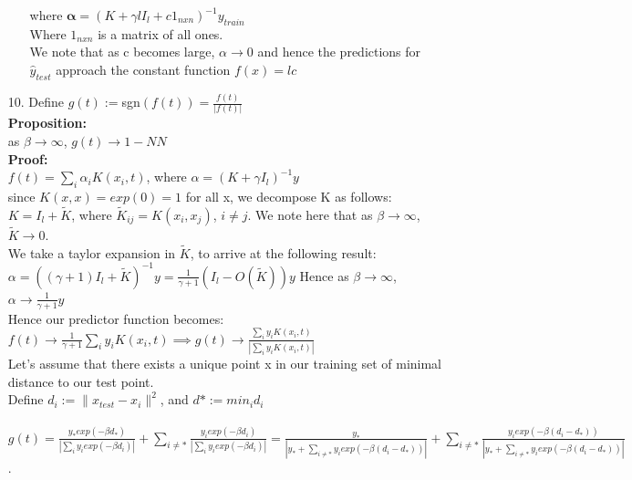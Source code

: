 \documentclass[12pt]{article}
\begin{document}
\begin{enumerate}[leftmargin=\labelsep]
\begin{enumerate}
    where $\mathbf{\alpha} = ( K + \gamma l I_{l} + c 1_{nxn}) ^{-1} y_{train}$\\
    Where $1_{nxn}$ is a matrix of all ones.\\

    We note that as c becomes large, $\alpha \to 0$ and hence the predictions for $\hat{y}_{test}$ approach
    the constant function $f(x) = lc$
\end{enumerate}

\newpage
\item[10.]  Define $g(t) := $sgn$(f(t)) = \frac{f(t)}{| f(t)|}$\\
    \textbf{Proposition:}\\
    
    as $\beta \to \infty$, $g(t) \to 1-NN$\\
    
    \textbf{Proof:}\\
    
    $f(t) = \sum_{i} \alpha_{i} K(x_{i}, t)$, where $ \alpha = (K + \gamma I_{l})^{-1} y$\\
    
    since $K(x,x) = exp(0) = 1$ for  all x, we decompose K as follows:\\
    
    $K = I_{l} + \tilde{K}$, where $\tilde{K}_{ij} = K(x_i, x_j)$, $i \ne j$. We note here that as $\beta \to \infty$, $ \tilde{K} \to 0$.\\
    
    We take a taylor expansion in $\tilde{K}$, to arrive at the following result:\\
    
    $\alpha = ((\gamma+1) I_{l} + \tilde{K})^{-1} y = \frac{1}{\gamma + 1} (I_{l} - O(\tilde{K})) y $
    Hence as $\beta \to \infty$, $\alpha \to \frac{1}{\gamma +1}y$\\
    Hence our predictor function becomes:\\
    $f(t) \to \frac{1}{\gamma+1} \sum_{i} y_{i} K(x_{i}, t) \implies g(t)  \to \frac{\sum_{i} y_{i} K(x_{i}, t)}{|\sum_{i} y_{i} K(x_{i}, t)|}
    $\\

    Let's assume that there exists a unique point x in our training set of minimal distance to our test point.\\
    
    Define $d_{i} := \|x_{test} - x_{i}\|^{2}$, and $d* := min_{i} d_{i}$\\
    \\
    $g(t) = \frac{y_{*} exp(-\beta d_{*})}{|\sum_{i} y_{i} exp(-\beta d_{i})|} + \sum_{i\ne *}\frac{y_{i} exp(-\beta d_{i})}{|\sum_{i} y_{i} exp(-\beta 
    d_{i})|} = \frac{y_{*}}{|y_{*} + \sum_{i \ne *} y_{i} exp(-\beta (d_{i} - d_{*}))|} + \sum_{i\ne *}\frac{y_{i} exp(-\beta (d_{i} - d_{*}))}{|y_{*} + \sum_{i \ne *} y_{i} exp(-\beta (d_{i} - d_{*}))|}$.\\
    

\end{enumerate}
\end{document}
